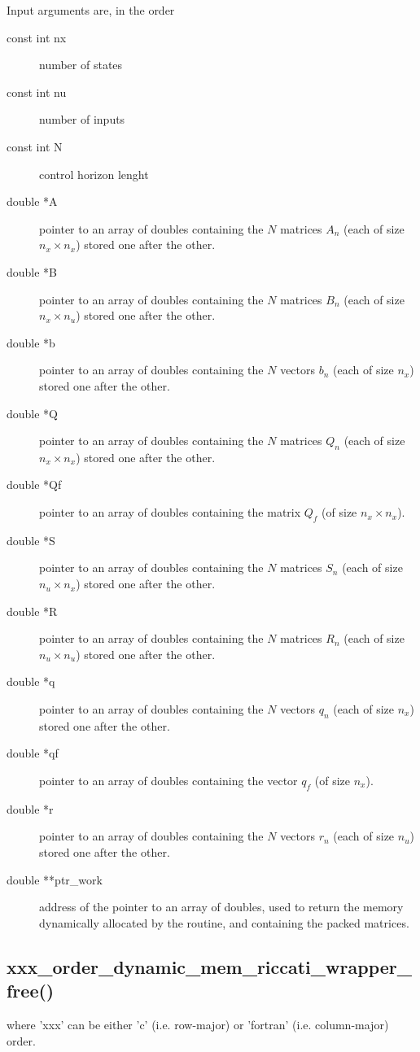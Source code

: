 \documentclass[a4paper]{report}
\begin{document}
Input arguments are, in the order
\begin{description}
\item[const int nx] number of states
\item[const int nu] number of inputs
\item[const int N] control horizon lenght
\item[double *A] pointer to an array of doubles containing the $N$ matrices $A_n$ (each of size $n_x\times n_x$) stored one after the other.
\item[double *B] pointer to an array of doubles containing the $N$ matrices $B_n$ (each of size $n_x\times n_u$) stored one after the other.
\item[double *b] pointer to an array of doubles containing the $N$ vectors $b_n$ (each of size $n_x$) stored one after the other.
\item[double *Q] pointer to an array of doubles containing the $N$ matrices $Q_n$ (each of size $n_x\times n_x$) stored one after the other.
\item[double *Qf] pointer to an array of doubles containing the matrix $Q_f$ (of size $n_x\times n_x$).
\item[double *S] pointer to an array of doubles containing the $N$ matrices $S_n$ (each of size $n_u\times n_x$) stored one after the other.
\item[double *R] pointer to an array of doubles containing the $N$ matrices $R_n$ (each of size $n_u\times n_u$) stored one after the other.
\item[double *q] pointer to an array of doubles containing the $N$ vectors $q_n$ (each of size $n_x$) stored one after the other.
\item[double *qf] pointer to an array of doubles containing the vector $q_f$ (of size $n_x$).
\item[double *r] pointer to an array of doubles containing the $N$ vectors $r_n$ (each of size $n_u$) stored one after the other.
\item[double **ptr\_work] address of the pointer to an array of doubles, used to return the memory dynamically allocated by the routine, and containing the packed matrices.
\end{description}


\subsection{xxx\_order\_dynamic\_mem\_riccati\_wrapper\_free() } 
where 'xxx' can be either 'c' (i.e. row-major) or 'fortran' (i.e. column-major) order.
\end{document}
